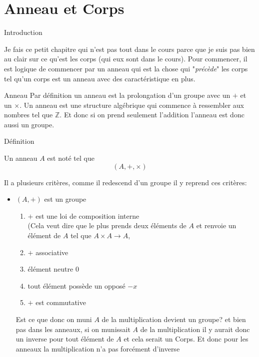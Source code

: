 \chapter{Anneau et Corps}
\begin{parag}{Introduction}
    
Je fais ce petit chapitre qui n'est pas tout dans le cours parce que je suis pas bien au clair sur ce qu'est les corps (qui eux sont dans le cours). Pour commencer, il est logique de commencer par un anneau qui est la chose qui "\textit{précède}" les corps tel qu'un corps est un anneau avec des caractéristique en plus.
\end{parag}

\begin{parag}{Anneau}
    Par définition un anneau est la prolongation d'un groupe avec un $+$ et un $\times$. Un anneau est une structure algébrique qui commence à ressembler aux nombres tel que $\mathbb{Z}$. Et donc si on prend seulement l'addition l'anneau est donc aussi un groupe.
    \begin{subparag}{Définition}
        \begin{definition}
            Un anneau $A$ est noté tel que
            \[(A, +, \times)\]
        \end{definition}
        Il a plusieurs critères, comme il redescend d'un groupe il y reprend ces critères: 
        \begin{itemize}
            \item $(A, +)$ est un groupe
            \begin{enumerate}
                \item $+$ est une loi de composition interne
                \\
                (Cela veut dire que le plus prends deux éléments de $A$ et renvoie un élément de $A$ tel que $A \times A \to A$,
                \item $+$ associative
                \item élément neutre $0$
                \item tout élément possède un opposé $-x$
                \item $+$ est commutative
            \end{enumerate}
            Est ce que donc on muni $A$ de la multiplication devient un groupe? et bien pas dans les anneaux, si on munissait $A$ de la multiplication il y aurait donc un inverse pour tout élément de $A$ et cela serait un Corps. Et donc pour les anneaux la multiplication n'a pas forcément d'inverse

\end{itemize}
\end{subparag}
\end{parag}
